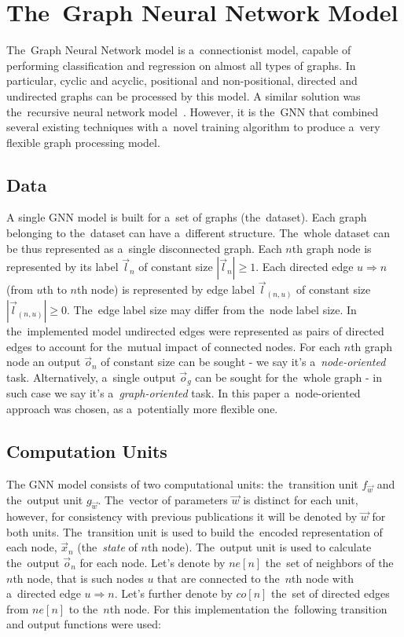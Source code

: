 \documentclass{llncs}
\begin{document}
\section{The~Graph Neural Network Model}
The~Graph Neural Network model is a~connectionist model, capable of performing classification and regression on almost all types of graphs\cite{scarselli2009graph}. In particular, cyclic and acyclic, positional and non-positional, directed and undirected graphs can be processed by this model. A similar solution was the~recursive neural network model~\cite{bianchini2005recursive}. However, it is the~GNN that combined several existing techniques with a~novel training algorithm to produce a~very flexible graph processing model.

\subsection{Data}
A single GNN model is built for a~set of graphs (the~dataset). Each graph belonging to the~dataset can have a~different structure. The~whole dataset can be thus represented as a~single disconnected graph. Each $n$th graph node is represented by its label $\vec{l}_n$ of constant size $|\vec{l}_n| \geq 1$. Each directed edge $u \Rightarrow n$ (from $u$th to $n$th node) is represented by edge label $\vec{l}_{(n,u)}$ of constant size $|\vec{l}_{(n,u)}| \geq 0$. The~edge label size may differ from the~node label size. In the~implemented model undirected edges were represented as pairs of directed edges to account for the~mutual impact of connected nodes. For each $n$th graph node an output $\vec{o}_n$ of constant size can be sought - we say it's a~\emph{node-oriented} task. Alternatively, a~single output $\vec{o}_g$ can be sought for the~whole graph - in such case we say it's a~\emph{graph-oriented} task. In this paper a~node-oriented approach was chosen, as a~potentially more flexible one.

\subsection{Computation Units}
The GNN model consists of two computational units: the~transition unit $f_{\vec{w}}$ and the~output unit $g_{\vec{w}}$. The~vector of parameters $\vec{w}$ is distinct for each unit, however, for consistency with previous publications it will be denoted by $\vec{w}$ for both units. The~transition unit is used to build the~encoded representation of each node, $\vec{x}_n$ (the~\emph{state} of $n$th node). The~output unit is used to calculate the~output $\vec{o}_n$ for each node. Let's denote by $ne[n]$ the~set of neighbors of the~$n$th node, that is such nodes $u$ that are connected to the~$n$th node with a~directed edge $u \Rightarrow n$. Let's further denote by $co[n]$ the~set of directed edges from $ne[n]$ to the~$n$th node. For this implementation the~following transition and output functions were used:
\end{document}
